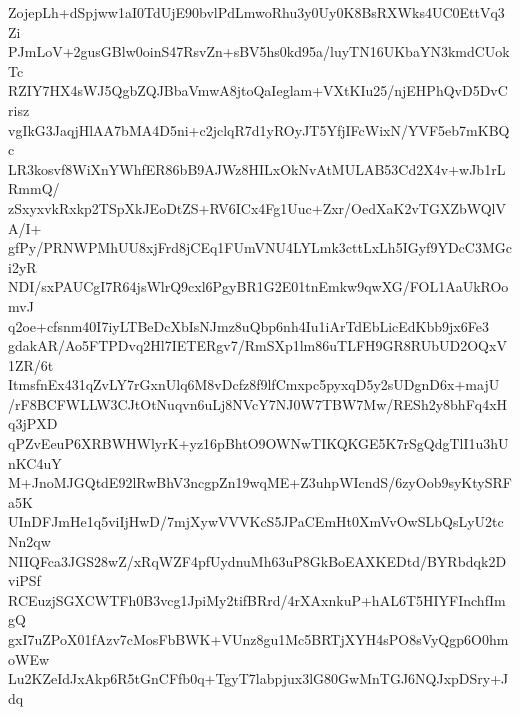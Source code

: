 ZojepLh+dSpjww1aI0TdUjE90bvlPdLmwoRhu3y0Uy0K8BsRXWks4UC0EttVq3Zi
PJmLoV+2gusGBlw0oinS47RsvZn+sBV5hs0kd95a/luyTN16UKbaYN3kmdCUokTc
RZIY7HX4sWJ5QgbZQJBbaVmwA8jtoQaIeglam+VXtKIu25/njEHPhQvD5DvCrisz
vgIkG3JaqjHlAA7bMA4D5ni+c2jclqR7d1yROyJT5YfjIFcWixN/YVF5eb7mKBQc
LR3kosvf8WiXnYWhfER86bB9AJWz8HILxOkNvAtMULAB53Cd2X4v+wJb1rLRmmQ/
zSxyxvkRxkp2TSpXkJEoDtZS+RV6ICx4Fg1Uuc+Zxr/OedXaK2vTGXZbWQlVA/I+
gfPy/PRNWPMhUU8xjFrd8jCEq1FUmVNU4LYLmk3cttLxLh5IGyf9YDcC3MGci2yR
NDI/sxPAUCgI7R64jsWlrQ9cxl6PgyBR1G2E01tnEmkw9qwXG/FOL1AaUkROomvJ
q2oe+cfsnm40I7iyLTBeDcXbIsNJmz8uQbp6nh4Iu1iArTdEbLicEdKbb9jx6Fe3
gdakAR/Ao5FTPDvq2Hl7IETERgv7/RmSXp1lm86uTLFH9GR8RUbUD2OQxV1ZR/6t
ItmsfnEx431qZvLY7rGxnUlq6M8vDcfz8f9lfCmxpc5pyxqD5y2sUDgnD6x+majU
/rF8BCFWLLW3CJtOtNuqvn6uLj8NVcY7NJ0W7TBW7Mw/RESh2y8bhFq4xHq3jPXD
qPZvEeuP6XRBWHWlyrK+yz16pBhtO9OWNwTIKQKGE5K7rSgQdgTlI1u3hUnKC4uY
M+JnoMJGQtdE92lRwBhV3ncgpZn19wqME+Z3uhpWIcndS/6zyOob9syKtySRFa5K
UInDFJmHe1q5viIjHwD/7mjXywVVVKcS5JPaCEmHt0XmVvOwSLbQsLyU2tcNn2qw
NIIQFca3JGS28wZ/xRqWZF4pfUydnuMh63uP8GkBoEAXKEDtd/BYRbdqk2DviPSf
RCEuzjSGXCWTFh0B3vcg1JpiMy2tifBRrd/4rXAxnkuP+hAL6T5HIYFInchfImgQ
gxI7uZPoX01fAzv7cMosFbBWK+VUnz8gu1Mc5BRTjXYH4sPO8sVyQgp6O0hmoWEw
Lu2KZeIdJxAkp6R5tGnCFfb0q+TgyT7labpjux3lG80GwMnTGJ6NQJxpDSry+Jdq
